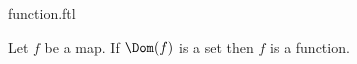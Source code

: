 \documentclass{stex}
\begin{document}
\begin{smodule}{function.ftl}

\begin{axiom}[forthel,title=Function Axiom,id=FOUNDATIONS_10_7781693549182976]
  Let $f$ be a map.
  If $\Dom(f)$ is a set then $f$ is a function.
\end{axiom}
\end{smodule}
\end{document}
